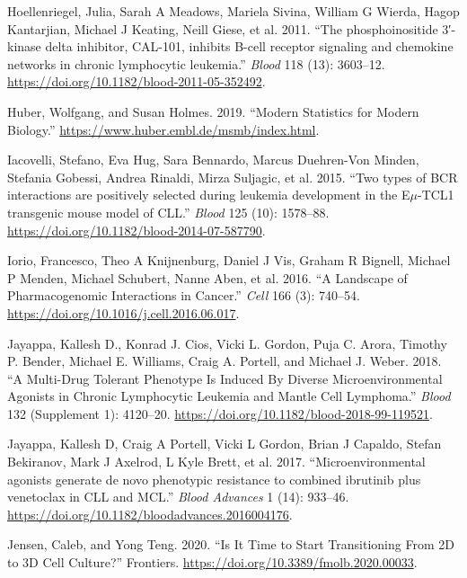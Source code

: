 \documentclass[11pt, a4paper, twosided]{book}
\newenvironment{CSLReferences}%
  {}%
  {\par}
\begin{document}
\begin{CSLReferences}{1}{0}
\leavevmode{}%
Hoellenriegel, Julia, Sarah A Meadows, Mariela Sivina, William G Wierda, Hagop Kantarjian, Michael J Keating, Neill Giese, et al. 2011. {``{The phosphoinositide 3′-kinase delta inhibitor, CAL-101, inhibits B-cell receptor signaling and chemokine networks in chronic lymphocytic leukemia}.''} \emph{Blood} 118 (13): 3603--12. \url{https://doi.org/10.1182/blood-2011-05-352492}.

\leavevmode{}%
Huber, Wolfgang, and Susan Holmes. 2019. {``{Modern Statistics for Modern Biology}.''} \url{https://www.huber.embl.de/msmb/index.html}.

\leavevmode{}%
Iacovelli, Stefano, Eva Hug, Sara Bennardo, Marcus Duehren-Von Minden, Stefania Gobessi, Andrea Rinaldi, Mirza Suljagic, et al. 2015. {``{Two types of BCR interactions are positively selected during leukemia development in the E\(\mu\)-TCL1 transgenic mouse model of CLL}.''} \emph{Blood} 125 (10): 1578--88. \url{https://doi.org/10.1182/blood-2014-07-587790}.

\leavevmode{}%
Iorio, Francesco, Theo A Knijnenburg, Daniel J Vis, Graham R Bignell, Michael P Menden, Michael Schubert, Nanne Aben, et al. 2016. {``{A Landscape of Pharmacogenomic Interactions in Cancer}.''} \emph{Cell} 166 (3): 740--54. \url{https://doi.org/10.1016/j.cell.2016.06.017}.

\leavevmode{}%
Jayappa, Kallesh D., Konrad J. Cios, Vicki L. Gordon, Puja C. Arora, Timothy P. Bender, Michael E. Williams, Craig A. Portell, and Michael J. Weber. 2018. {``{A Multi-Drug Tolerant Phenotype Is Induced By Diverse Microenvironmental Agonists in Chronic Lymphocytic Leukemia and Mantle Cell Lymphoma}.''} \emph{Blood} 132 (Supplement 1): 4120--20. \url{https://doi.org/10.1182/blood-2018-99-119521}.

\leavevmode{}%
Jayappa, Kallesh D, Craig A Portell, Vicki L Gordon, Brian J Capaldo, Stefan Bekiranov, Mark J Axelrod, L Kyle Brett, et al. 2017. {``{Microenvironmental agonists generate de novo phenotypic resistance to combined ibrutinib plus venetoclax in CLL and MCL}.''} \emph{Blood Advances} 1 (14): 933--46. \url{https://doi.org/10.1182/bloodadvances.2016004176}.

\leavevmode{}%
Jensen, Caleb, and Yong Teng. 2020. {``{Is It Time to Start Transitioning From 2D to 3D Cell Culture?}''} Frontiers. \url{https://doi.org/10.3389/fmolb.2020.00033}.


\end{CSLReferences}
\end{document}
